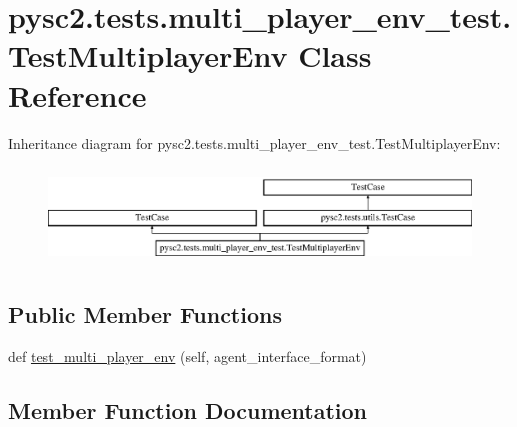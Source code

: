 \hypertarget{classpysc2_1_1tests_1_1multi__player__env__test_1_1_test_multiplayer_env}{}\section{pysc2.\+tests.\+multi\+\_\+player\+\_\+env\+\_\+test.\+Test\+Multiplayer\+Env Class Reference}
\label{classpysc2_1_1tests_1_1multi__player__env__test_1_1_test_multiplayer_env}
Inheritance diagram for pysc2.\+tests.\+multi\+\_\+player\+\_\+env\+\_\+test.\+Test\+Multiplayer\+Env\+:\begin{figure}[H]
\begin{center}
\leavevmode
\includegraphics[height=2.616822cm]{classpysc2_1_1tests_1_1multi__player__env__test_1_1_test_multiplayer_env}
\end{center}
\end{figure}
\subsection*{Public Member Functions}
\begin{DoxyCompactItemize}
\item 
def \mbox{\hyperlink{classpysc2_1_1tests_1_1multi__player__env__test_1_1_test_multiplayer_env_a0d2fb6ccbffbc900ef133c369a72059c}{test\+\_\+multi\+\_\+player\+\_\+env}} (self, agent\+\_\+interface\+\_\+format)
\end{DoxyCompactItemize}


\subsection{Member Function Documentation}
\mbox{\label{classpysc2_1_1tests_1_1multi__player__env__test_1_1_test_multiplayer_env_a0d2fb6ccbffbc900ef133c369a72059c}} 
